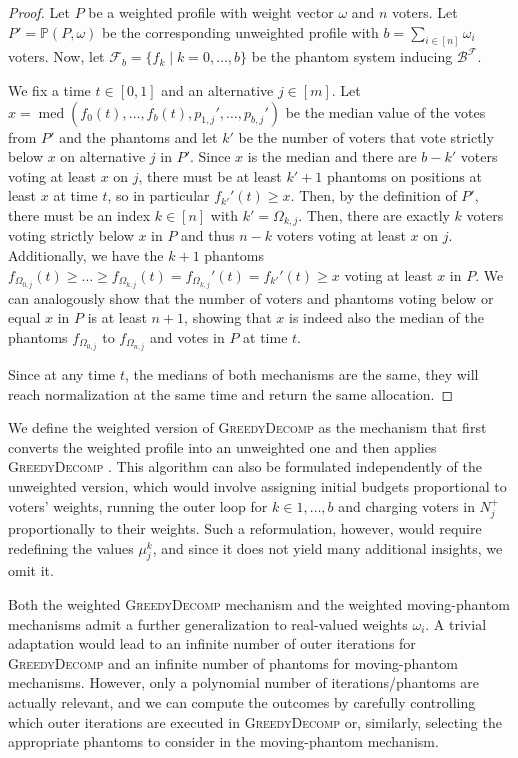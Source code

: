 \documentclass[11pt]{article}
\DeclareMathOperator*{\med}{med}
\newcommand{\F}{\mathcal{F}}
\newcommand{\B}{\mathcal{B}}
\newcommand{\GrdDec}{\textsc{GreedyDecomp} }
\begin{document}
\begin{proof}
    Let $P$ be a weighted profile with weight vector $\omega$ and $n$ voters. Let $P' = \mathbb{P}(P, \omega)$ be the corresponding unweighted profile with $b = \sum_{i\in[n]} \omega_i$ voters. 
    Now, let $\F_{b} = \{f_k \mid k = 0, \dots, b\}$ be the phantom system inducing $\B^\F$. 
    
    We fix a time $t \in [0,1]$ and an alternative $j \in [m]$. Let $x = \med(f_{0}(t), \dots, f_{b}(t), p_{1,j}', \dots, p_{b,j}')$ be the median value of the votes from $P'$ and the phantoms and let $k'$ be the number of voters that vote strictly below $x$ on alternative $j$ in $P'$. Since $x$ is the median and there are $b-k'$ voters voting at least $x$ on $j$, there must be at least $k'+1$ phantoms on positions at least $x$ at time $t$, so in particular $f_{k'}'(t) \ge x$.
    Then, by the definition of $P'$, there must be an index $k \in [n]$ with $k' = \Omega_{k, j}$. Then, there are exactly $k$ voters voting strictly below $x$ in $P$ and thus $n-k$ voters voting at least $x$ on $j$. Additionally, we have the $k+1$ phantoms $f_{\Omega_{0,j}}(t) \ge \dots \ge f_{\Omega_{k,j}}(t) = f_{\Omega_{k,j}}'(t) = f_{k'}'(t) \ge x $  voting at least $x$ in $P$. 
    We can analogously show that the number of voters and phantoms voting below or equal $x$ in $P$ is at least $n+1$, showing that $x$ is indeed also the median of the phantoms $f_{\Omega_{0,j}}$ to $f_{\Omega_{n,j}}$ and votes in $P$ at time $t$.

    Since at any time $t$, the medians of both mechanisms are the same, they will reach normalization at the same time and return the same allocation. 
\end{proof}

We define the weighted version of \GrdDec as the mechanism that first converts the weighted profile into an unweighted one and then applies \GrdDec. This algorithm can also be formulated independently of the unweighted version, which would involve assigning initial budgets proportional to voters' weights, running the outer loop for $k \in 1, \dots, b$ and charging voters in $N^+_j$ proportionally to their weights. Such a reformulation, however, would require redefining the values $\mu^k_j$, and since it does not yield many additional insights, we omit it.

Both the weighted \GrdDec mechanism and the weighted moving-phantom mechanisms admit a further generalization to real-valued weights $\omega_i$. 
A trivial adaptation would lead to an infinite number of outer iterations for \GrdDec and an infinite number of phantoms for moving-phantom mechanisms.
However, only a polynomial number of iterations/phantoms are actually relevant, and we can compute the outcomes by carefully controlling which outer iterations are executed in \GrdDec or, similarly, selecting the appropriate phantoms to consider in the moving-phantom mechanism.
\end{document}
